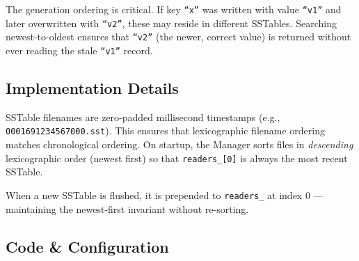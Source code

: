 \documentclass[11pt,a4paper]{article}
\begin{document}
The generation ordering is critical. If key \texttt{``x''} was written with
value \texttt{``v1''} and later overwritten with \texttt{``v2''}, these may
reside in different SSTables. Searching newest-to-oldest ensures that
\texttt{``v2''} (the newer, correct value) is returned without ever reading
the stale \texttt{``v1''} record.

\subsection{Implementation Details}

SSTable filenames are zero-padded millisecond timestamps
(e.g., \texttt{0001691234567000.sst}). This ensures that lexicographic
filename ordering matches chronological ordering. On startup, the Manager sorts
files in \emph{descending} lexicographic order (newest first) so that
\texttt{readers\_[0]} is always the most recent SSTable.

When a new SSTable is flushed, it is prepended to \texttt{readers\_} at
index 0 --- maintaining the newest-first invariant without re-sorting.

\subsection{Code \& Configuration}
\end{document}
